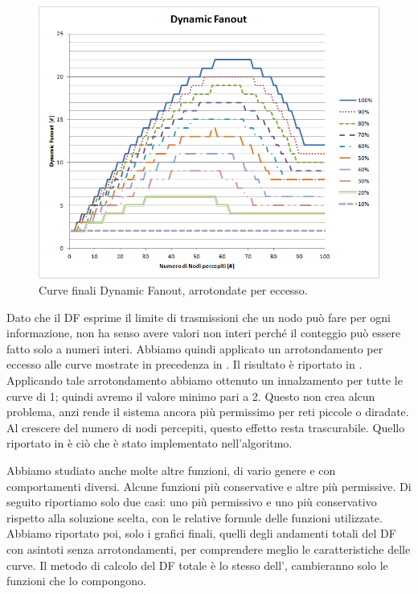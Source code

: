 \begin{figure}[t]
	\centering
	\includegraphics[width=0.9\linewidth]{Images/grafici_usati/DF_tot_arr}
	\caption[DF finale (arrotondato)]{Curve finali Dynamic Fanout, arrotondate per eccesso.}
	\label{fig:DF_tot_arr}
\end{figure}

Dato che il DF esprime il limite di trasmissioni che un nodo può fare per ogni informazione, non ha senso avere valori non interi perché il conteggio può essere fatto solo a numeri interi. Abbiamo quindi applicato un arrotondamento per eccesso alle curve mostrate in precedenza in . Il risultato è riportato in . Applicando tale arrotondamento abbiamo ottenuto un innalzamento per tutte le curve di 1; quindi avremo il valore minimo pari a 2. Questo non crea alcun problema, anzi rende il sistema ancora più permissimo per reti piccole o diradate. Al crescere del numero di nodi percepiti, questo effetto resta trascurabile. Quello riportato in  è ciò che è stato implementato nell'algoritmo.

Abbiamo studiato anche molte altre funzioni, di vario genere e con comportamenti diversi. Alcune funzioni più conservative e altre più permissive. Di seguito riportiamo solo due casi: uno più permissivo e uno più conservativo rispetto alla soluzione scelta, con le relative formule delle funzioni utilizzate. Abbiamo riportato poi, solo i grafici finali, quelli degli andamenti totali del DF con asintoti senza arrotondamenti, per comprendere meglio le caratteristiche delle curve. Il metodo di calcolo del DF totale è lo stesso dell',  cambieranno solo le funzioni che lo compongono.

